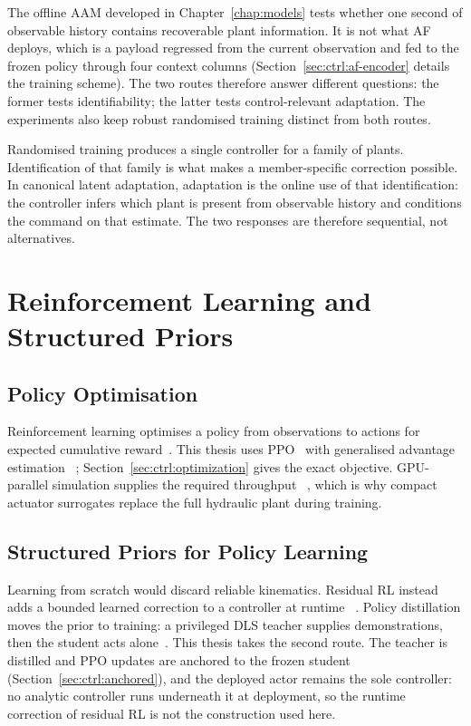 The offline AAM developed in Chapter~\ref{chap:models} tests whether one second
of observable history contains recoverable plant information. It is not what AF
deploys, which is a payload regressed from the current observation and fed to
the frozen policy through four context columns
(Section~\ref{sec:ctrl:af-encoder} details the training scheme). The two routes
therefore answer different questions: the former tests identifiability; the
latter tests control-relevant adaptation. The experiments also keep robust
randomised training distinct from both routes.

Randomised training produces a single controller for a family of plants.
Identification of that family is what makes a member-specific correction
possible. In canonical latent adaptation, adaptation is the online use of that
identification: the controller infers which plant is present from observable
history and conditions the command on that estimate. The two responses are
therefore sequential, not alternatives.

\section{Reinforcement Learning and Structured Priors}
\label{sec:fund:rl-residual}

\subsection{Policy Optimisation}

Reinforcement learning optimises a policy from observations to actions for
expected cumulative reward~\cite{sutton2018reinforcement}. This thesis uses
PPO~\cite{schulman2017proximal} with generalised advantage estimation
~\cite{schulman2016gae}; Section~\ref{sec:ctrl:optimization} gives the exact
objective. GPU-parallel simulation supplies the required throughput
~\cite{makoviychuk2021isaac,rudin2022learning}, which is why compact actuator
surrogates replace the full hydraulic plant during training.

\subsection{Structured Priors for Policy Learning}
\label{sec:fund:prior}

Learning from scratch would discard reliable kinematics. Residual RL instead
adds a bounded learned correction to a controller at runtime
~\cite{johannink2019residual,silver2018residual}. Policy distillation moves the
prior to training: a privileged DLS teacher supplies demonstrations, then the
student acts alone~\cite{ross2011reduction}. This thesis takes the second
route. The teacher is distilled and PPO updates are anchored to the frozen
student (Section~\ref{sec:ctrl:anchored}), and the deployed actor remains the
sole controller: no analytic controller runs underneath it at deployment, so
the runtime correction of residual RL is not the construction used here.

